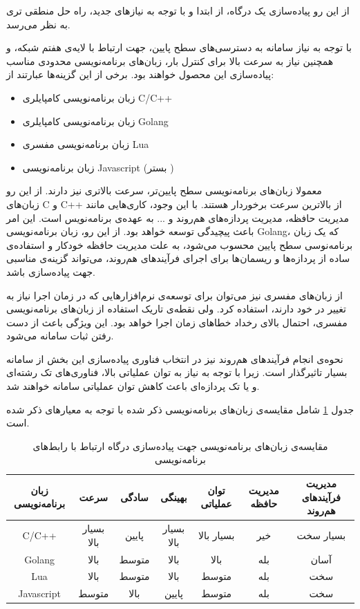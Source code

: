 از این رو پیاده‌سازی یک درگاه، از ابتدا و با توجه به نیاز‌های جدید،‌ راه حل منطقی تری به نظر می‌رسد.

با توجه به نیاز سامانه‌ به دسترسی‌های سطح پایین، جهت ارتباط با لایه‌ی هفتم شبکه، و همچنین نیاز به سرعت بالا برای کنترل بار، زبان‌های برنامه‌نویسی محدودی مناسب پیاده‌سازی این محصول خوا‌هند بود. برخی از این گزینه‌ها عبارتند از:

\begin{itemize}
    \item زبان برنامه‌نویسی کامپایلری C/C++
    \item زبان برنامه‌نویسی کامپایلری Golang
    \item زبان برنامه‌نویسی مفسری Lua
    \item زبان برنامه‌نویسی Javascript (بستر )
\end{itemize}

معمولا زبان‌های برنامه‌نویسی سطح پایین‌تر، سرعت بالاتری نیز دارند. از این رو زبان‌های C و C++ از بالاترین سرعت برخوردار هستند. با این وجود، کاری‌هایی مانند مدیریت حافظه، مدیریت پردازه‌های هم‌روند و ... به عهده‌ی برنامه‌نویس است. این امر باعث پیچیدگی توسعه خواهد بود. از این رو، زبان برنامه‌نویسی Golang، که یک زبان برنامه‌نوسی سطح‌ پایین محسوب می‌شود، به علت مدیریت حافظه خودکار و استفاده‌ی ساده از پردازه‌ها
و ریسمان‌ها
برای اجرای فرآیند‌های هم‌روند، می‌تواند گزینه‌ی مناسبی جهت پیاده‌سازی باشد.

از زبان‌های مفسری نیز می‌توان برای توسعه‌ی نرم‌افزار‌هایی که در زمان اجرا نیاز به تغییر در خود دارند، استفاده کرد. ولی نقطه‌ی تاریک استفاده ‌از زبان‌های برنامه‌نویسی مفسری، احتمال بالای رخداد خطا‌های زمان اجرا خواهد بود. این ویژگی باعث از دست رفتن ثبات سامانه می‌شود.

نحوه‌ی انجام فرآیند‌های هم‌روند نیز در انتخاب فناوری پیاده‌سازی این بخش از سامانه بسیار تاثیرگذار است. زیرا با توجه به نیاز به توان عملیاتی بالا، فناوری‌های تک رشته‌ای و یا تک‌ پردازه‌ای باعث کاهش توان عملیاتی سامانه خواهند شد.

جدول
\ref{tab:choice}
شامل مقایسه‌ی زبان‌های برنامه‌نویسی ذکر شده با توجه‌ به معیار‌های ذکر شده است.

\begin{table}[H]
    \centering
    \caption{مقایسه‌ی زبان‌های برنامه‌نویسی جهت پیاده‌سازی درگاه ارتباط با رابط‌های برنامه‌نویسی}\label{tab:choice}
    \begin{tabular}{|c|c|c|c|c|c|c|}
        \hline
        زبان برنامه‌نویسی & سرعت & سادگی & بهینگی & توان عملیاتی & مدیریت حافظه & مدیریت فرآیند‌های هم‌روند\\
        \hline
        C/C++ & بسیار بالا & پایین & بسیار بالا & بسیار بالا & خیر & بسیار سخت\\
        \hline
        Golang & بالا & متوسط & بالا & بالا & بله & آسان\\
        \hline
        Lua & بالا & متوسط & بالا & متوسط & بله & سخت\\
        \hline
        Javascript & متوسط & بالا & پایین & متوسط & بله & سخت\\
        \hline
    \end{tabular}

\end{table}



